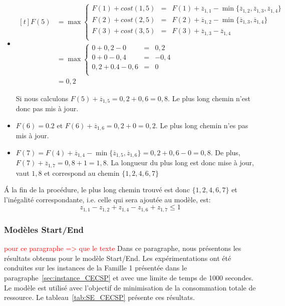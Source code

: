 \begin{ex}
\begin{itemize}
\item $\begin{aligned}[t] 
    F(5) &=  \max \left\{
        \begin{array}{lcl}
          F(1) + cost (1,5) & = & F(1) + \overline{z}_{1,1}  -
                                  \min\{\overline{z}_{1,2},\overline{z}_{1,3},\overline{z}_{1,4}\} 
          \\ 
          F(2) + cost (2,5) &= & F(2) + \overline{z}_{1,2} -
                             \min\{\overline{z}_{1,3}, \overline{z}_{1,4}\}\\
          F(3) + cost (3,5) &= & F(3) + \overline{z}_{1,3} -
                             \overline{z}_{1,4} \\
        \end{array} \right.\\
      &=  \max \left\{ 
        \begin{array}{lcl}
          0 + 0,2 - 0 &=& 0,2 \\
          0 + 0 - 0,4 &= &-0,4 \\
          0,2 + 0.4 - 0,6 &= & 0 \\ 
        \end{array} \right.\\
    &=  0,2
  \end{aligned}$

  Si nous calculons $F(5)+\overline{z}_{1,5}=0,2+0,6=0,8$. Le plus
  long chemin n'est donc pas mis à jour. 

\item $F(6)= 0.2$ et $F(6)+\overline{z}_{1,6}=0,2+0=0,2$. Le plus long  
  chemin n'es pas mis à jour. 
\item $F(7) = F(4) +\overline{z}_{1,4} -
  \min\{\overline{z}_{1,5},\overline{z}_{1,6}\}= 0,2 + 0,6 - 0 =
  0,8$. De plus, $F(7)+\overline{z}_{1,7}=0,8+1=1,8$. La longueur du
  plus long est donc mise à jour, vaut $1,8$ et correspond au chemin $\{1,2,4,6,7\}$
\end{itemize}

{\'A} la fin de la procédure, le plus long chemin trouvé est donc
$\{1,2,4,6,7\}$ et l'inégalité correspondante, i.e. celle qui sera
ajoutée au modèle, est:
\[  z_{1,1} - z_{1,2} + z_{1,4} - z_{1,6} + z_{1,7} \le 1  \]
\end{ex}  

\subsubsection{Modèles Start/End}
\textcolor{red}{\LARGE pour ce paragraphe => que le texte}
Dans ce paragraphe, nous présentons les résultats obtenus pour le
modèle Start/End.  Les expérimentations ont été conduites
sur les instances de la Famille 1 présentée dans le
paragraphe~\ref{sec:instance_CECSP} et avec une limite de temps de
1000 secondes. Le modèle est utilisé avec l'objectif de minimisation de la
consommation totale de ressource. Le
tableau~\ref{tab:SE_CECSP} présente ces résultats.

